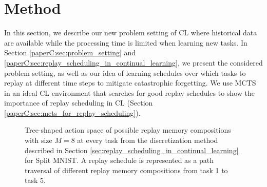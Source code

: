 
\section{Method}\label{paperC:sec:method}

In this section, we describe our new problem setting of CL where historical data are available while the processing time is limited when learning new tasks. 
In Section \ref{paperC:sec:problem_setting} and \ref{paperC:sec:replay_scheduling_in_continual_learning}, we present the considered problem setting, as well as our idea of learning schedules over which tasks to replay at different time steps to mitigate catastrophic forgetting.
We use MCTS~ in an ideal CL environment that searches for good replay schedules to show the importance of replay scheduling in CL (Section \ref{paperC:sec:mcts_for_replay_scheduling}). 




\begin{figure}[t]
\centering 
\setlength{\figwidth}{.77\textwidth}
\setlength{\figheight}{.3\textheight}

\vspace{-2mm}
\caption{Tree-shaped action space of possible replay memory compositions with size $M=8$ at every task from the discretization method described in Section \ref{sec:replay_scheduling_in_continual_learning} for Split MNIST. A replay schedule is represented as a path traversal of different replay memory compositions from task 1 to task 5. 
}
\vspace{-3mm}
\label{fig:replay_scheduling_mcts_tree_example}
\end{figure}










